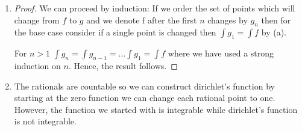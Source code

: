 \begin{enumerate}[label=(\alph*)]
    \item
    \begin{proof}
        We can proceed by induction:
        If we order the set of points which will change from $f$ to $g$
        and we denote f after the first $n$ changes by $g_n$ then
        for the base case consider if a single point is changed then 
        $\int g_1 = \int f$ by (a).

        For $n>1$ $\int g_n = \int g_{n-1} = \dots \int g_1 = \int f$ 
        where we have used a strong induction on $n$. Hence, the result 
        follows.
    \end{proof}

    \item
    The rationals are countable so we can construct dirichlet's function
    by starting at the zero function we can change each rational point to one.
    However, the function we started with is integrable while dirichlet's
    function is not integrable.
\end{enumerate}

